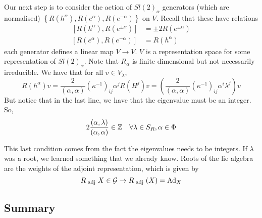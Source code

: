 Our next step is to consider the action of $ Sl ( 2) _ \alpha $ 
generators (which are normalised) 
$ \left\{  R ( h ^ \alpha ), R ( e ^ \alpha ) , R ( e ^{ - \alpha  } )   \right\}  $ on $ V $. 
Recall that these have relations
\begin{align*}
	\left[  R ( h ^ \alpha ), R ( e ^{ \pm \alpha } )   \right] &= \pm 2 R \left( e ^{ \pm \alpha }  \right)   \\
	\left[  R ( e ^ \alpha ) , R ( e ^{ - \alpha } )  \right]   & = R ( h ^ \alpha ) 
\end{align*}
each generator defines a linear map $ V \to V $. 
$ V $ is a representation space for some representation 
of $ Sl ( 2)_ \alpha  $. 
Note that $ R _ \alpha $ is finite dimensional but not necessarily irreducible. 
We have that for all $ v \in V _ \lambda $, 
\[
	R ( h ^ \alpha ) v = \frac{ 2 }{ \left( \alpha, \alpha  \right)  } 
\left( \kappa ^{ - 1}  \right)  _{ ij } \alpha ^ j R \left(  H ^ j  \right)  v = 
\left( \frac{2}{\left( \alpha, \alpha  \right)  } \left( \kappa ^{ - 1}  \right)  
_{ij } \alpha ^ i \lambda ^ j \right)  v  
\] But notice that in the last line, we have that 
the eigenvalue must be an integer. 
So, 
\[
2 \frac{\left( \alpha, \lambda  \right)  }{ \left( \alpha , \alpha  \right)  } \in \mathbb{Z} \quad
\forall \lambda \in S _ R , \alpha \in \Phi  
\]

This last condition comes from the fact the eigenvalues needs to be integers.  If $ \lambda $ was a root, we 
learned something that we already know. 
 Roots of the lie algebra are the weights of the adjoint representation, which 
 is given by 
 \[
	 R _{ \text{ adj } } X \in \mathcal{ G } \to R _{ \text{ adj } } ( X)  = \text{Ad}_ X 
 \]


\subsection{Summary}

